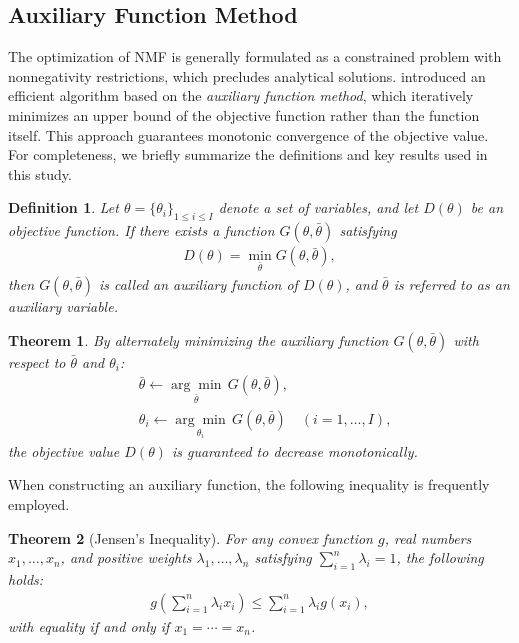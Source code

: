 \documentclass[pdflatex,sn-basic]{sn-jnl}%
\theoremstyle{thmstyleone}%
\newtheorem{theorem}{Theorem}%
\theoremstyle{thmstyletwo}%
\theoremstyle{thmstylethree}%
\newtheorem{definition}{Definition}%
\begin{document}
\begin{appendices}

\section{Auxiliary Function Method}\label{Sec: Auxiliary Function Method}

The optimization of NMF is generally formulated as a constrained problem with nonnegativity restrictions, which precludes analytical solutions.  
\citet{Lee1999} introduced an efficient algorithm based on the \emph{auxiliary function method}, which iteratively minimizes an upper bound of the objective function rather than the function itself.  
This approach guarantees monotonic convergence of the objective value.  
For completeness, we briefly summarize the definitions and key results used in this study.

\begin{definition}\label{Auxiliary Function}
Let $\theta = \{\theta_i\}_{1\leq i \leq I}$ denote a set of variables, and let $D(\theta)$ be an objective function.  
If there exists a function $G(\theta,\bar{\theta})$ satisfying
\begin{align}
    D(\theta) = \min_{\bar{\theta}} G(\theta,\bar{\theta}),
\end{align}
then $G(\theta,\bar{\theta})$ is called an \emph{auxiliary function} of $D(\theta)$, and $\bar{\theta}$ is referred to as an \emph{auxiliary variable}.
\end{definition}

\begin{theorem}\label{Auxiliary Function Method}
By alternately minimizing the auxiliary function $G(\theta,\bar{\theta})$ with respect to $\bar{\theta}$ and $\theta_i$:
\begin{align}
    &\bar{\theta} \leftarrow \underset{\bar{\theta}}{\arg\min}\, G(\theta,\bar{\theta}),\\
    &\theta_i \leftarrow \underset{\theta_i}{\arg\min}\, G(\theta,\bar{\theta}) \quad (i=1,\ldots,I),
\end{align}
the objective value $D(\theta)$ is guaranteed to decrease monotonically.
\end{theorem}

When constructing an auxiliary function, the following inequality is frequently employed.

\begin{theorem}[Jensen’s Inequality]\label{Jensen's inequality}
For any convex function $g$, real numbers $x_1,\ldots,x_n$, and positive weights $\lambda_1,\ldots,\lambda_n$ satisfying $\sum_{i=1}^{n}\lambda_i = 1$, the following holds:
\begin{align}
    g\!\left(\sum_{i=1}^{n}\lambda_i x_i\right) \le \sum_{i=1}^{n}\lambda_i g(x_i),
\end{align}
with equality if and only if $x_1 = \cdots = x_n$.
\end{theorem}




\end{appendices}
\end{document}
